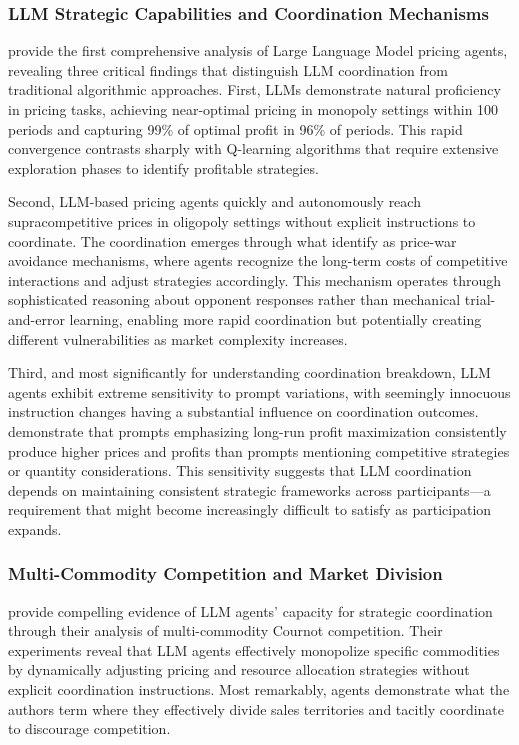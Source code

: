 \subsubsection*{LLM Strategic Capabilities and Coordination Mechanisms}

\textcite{fish_algorithmic_2025} provide the first comprehensive analysis of Large Language Model pricing agents, revealing three critical findings that distinguish LLM coordination from traditional algorithmic approaches. First, LLMs demonstrate natural proficiency in pricing tasks, achieving near-optimal pricing in monopoly settings within 100 periods and capturing 99\% of optimal profit in 96\% of periods. This rapid convergence contrasts sharply with Q-learning algorithms that require extensive exploration phases to identify profitable strategies.

Second, LLM-based pricing agents quickly and autonomously reach supracompetitive prices in oligopoly settings without explicit instructions to coordinate. The coordination emerges through what \textcite{fish_algorithmic_2025} identify as price-war avoidance mechanisms, where agents recognize the long-term costs of competitive interactions and adjust strategies accordingly. This mechanism operates through sophisticated reasoning about opponent responses rather than mechanical trial-and-error learning, enabling more rapid coordination but potentially creating different vulnerabilities as market complexity increases.

Third, and most significantly for understanding coordination breakdown, LLM agents exhibit extreme sensitivity to prompt variations, with seemingly innocuous instruction changes having a substantial influence on coordination outcomes. \textcite{fish_algorithmic_2025} demonstrate that prompts emphasizing long-run profit maximization consistently produce higher prices and profits than prompts mentioning competitive strategies or quantity considerations. This sensitivity suggests that LLM coordination depends on maintaining consistent strategic frameworks across participants---a requirement that might become increasingly difficult to satisfy as participation expands.

\subsubsection*{Multi-Commodity Competition and Market Division}

\textcite{lin_strategic_2025} provide compelling evidence of LLM agents' capacity for strategic coordination through their analysis of multi-commodity Cournot competition. Their experiments reveal that LLM agents effectively monopolize specific commodities by dynamically adjusting pricing and resource allocation strategies without explicit coordination instructions. Most remarkably, agents demonstrate what the authors \parencite*[p. 6]{lin_strategic_2025} term  where they effectively divide sales territories and tacitly coordinate to discourage competition.


